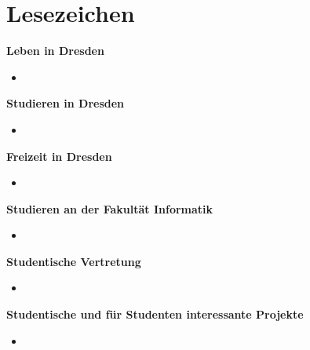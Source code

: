 \section{Lesezeichen}


\textbf{Leben in Dresden}
\begin{itemize}
\item
\end{itemize}

\textbf{Studieren in Dresden}
\begin{itemize}
\item
\end{itemize}

\textbf{Freizeit in Dresden}
\begin{itemize}
\item
\end{itemize}

\textbf{Studieren an der Fakultät Informatik}
\begin{itemize}
\item
\end{itemize}

\textbf{Studentische Vertretung}
\begin{itemize}
\item
\end{itemize}

\textbf{Studentische und für Studenten interessante Projekte}
\begin{itemize}
\item
\end{itemize}
